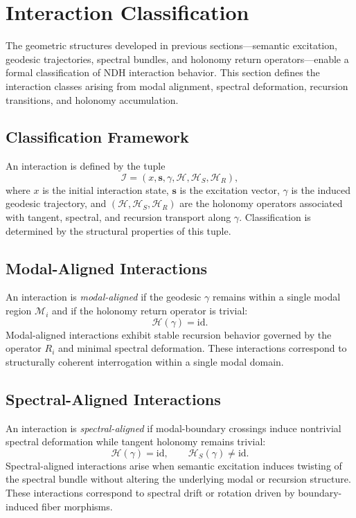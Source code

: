 \section{Interaction Classification}
\label{sec:interaction-classification}

The geometric structures developed in previous sections—semantic excitation,
geodesic trajectories, spectral bundles, and holonomy return operators—enable a
formal classification of NDH interaction behavior. This section defines the
interaction classes arising from modal alignment, spectral deformation,
recursion transitions, and holonomy accumulation.

\subsection{Classification Framework}

An interaction is defined by the tuple
\[
\mathcal{I} = (x, \mathbf{s}, \gamma, \mathcal{H}, \mathcal{H}_S, \mathcal{H}_R),
\]
where $x$ is the initial interaction state, $\mathbf{s}$ is the excitation
vector, $\gamma$ is the induced geodesic trajectory, and
$(\mathcal{H}, \mathcal{H}_S, \mathcal{H}_R)$ are the holonomy operators
associated with tangent, spectral, and recursion transport along $\gamma$.
Classification is determined by the structural properties of this tuple.

\subsection{Modal-Aligned Interactions}

An interaction is \emph{modal-aligned} if the geodesic $\gamma$ remains within a
single modal region $\mathcal{M}_i$ and if the holonomy return operator is
trivial:
\[
\mathcal{H}(\gamma) = \mathrm{id}.
\]
Modal-aligned interactions exhibit stable recursion behavior governed by the
operator $R_i$ and minimal spectral deformation. These interactions correspond
to structurally coherent interrogation within a single modal domain.

\subsection{Spectral-Aligned Interactions}

An interaction is \emph{spectral-aligned} if modal-boundary crossings induce
nontrivial spectral deformation while tangent holonomy remains trivial:
\[
\mathcal{H}(\gamma) = \mathrm{id}, \qquad
\mathcal{H}_S(\gamma) \neq \mathrm{id}.
\]
Spectral-aligned interactions arise when semantic excitation induces twisting of
the spectral bundle without altering the underlying modal or recursion
structure. These interactions correspond to spectral drift or rotation driven by
boundary-induced fiber morphisms.

